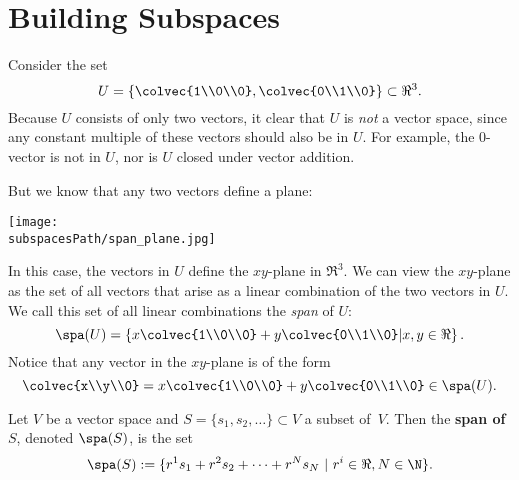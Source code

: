 

\section{Building Subspaces}

Consider the set 
\[
U= \left\{ \colvec{1\\0\\0}, \colvec{0\\1\\0} \right\} \subset \Re^3.
\]
Because $U$ consists of only two vectors, it clear that $U$ is \emph{not} a vector space, since any constant multiple of these vectors should also be in $U$.  For example, the $0$-vector is not in $U$, nor is $U$ closed under vector addition.

But we know that any two vectors define a plane:
\begin{center}
\texttt{[image: \\subspacesPath/span\_plane.jpg]}
\end{center}
 In this case, the vectors in $U$ define the $xy$-plane in $\Re^3$.  We can view the $xy$-plane as the set of all vectors that arise as a linear combination of the two vectors in $U$.  We call this set of all linear combinations the \emph{span} of $U$:
\[
\spa(U)=\left\{ x \colvec{1\\0\\0}+y \colvec{0\\1\\0} \middle| x,y\in \Re \right\}.
\]
Notice that any vector in the $xy$-plane is of the form
\[
\colvec{x\\y\\0} = x \colvec{1\\0\\0}+y \colvec{0\\1\\0} \in \spa(U).
\]

\begin{definition}
Let $V$ be a vector space and $S=\{ s_1, s_2, \ldots \} \subset V$ a subset of~$V$.  Then the {\bf span of $S$}, denoted $\spa(S)$, is the set
\[
\spa(S):=\{ r^1s_1+r^2s_2+\cdots + r^Ns_N ~|~ r^i\in \Re, N\in \N \}.
\]
\end{definition}

